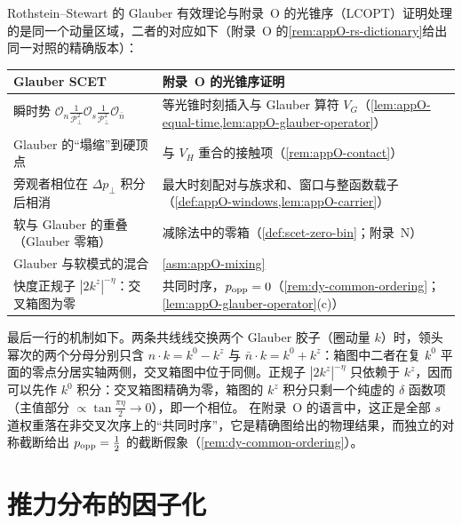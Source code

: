 \begin{remark}\label{rem:scet-glauber-dictionary}
Rothstein--Stewart 的 Glauber 有效理论与附录~O 的光锥序（LCOPT）证明处理的是同一个动量区域，二者的对应如下（附录~O 的\cref{rem:appO-rs-dictionary}给出同一对照的精确版本）：
\begin{center}\small
\renewcommand{\arraystretch}{1.15}
\begin{tabular}{@{}p{}p{}@{}}
\toprule
Glauber SCET\cite{RothsteinStewart2016} & 附录~O 的光锥序证明 \\
\midrule
瞬时势 $\mathcal O_n\frac{1}{\mathcal P_\perp^2}\mathcal O_s\frac{1}{\mathcal P_\perp^2}\mathcal O_{\bar n}$ & 等光锥时刻插入与 Glauber 算符 $V_G$（\cref{lem:appO-equal-time,lem:appO-glauber-operator}） \\
Glauber 的“塌缩”到硬顶点 & 与 $V_H$ 重合的接触项（\cref{rem:appO-contact}） \\
旁观者相位在 $\Delta p_\perp$ 积分后相消 & 最大时刻配对与族求和、窗口与整函数载子（\cref{def:appO-windows,lem:appO-carrier}） \\
软与 Glauber 的重叠（Glauber 零箱） & 减除法中的零箱（\cref{def:scet-zero-bin}；附录~N） \\
Glauber 与软模式的混合 & \cref{asm:appO-mixing} \\
快度正规子 $|2k^z|^{-\eta}$：交叉箱图为零 & 共同时序，$p_{\rm opp}=0$（\cref{rem:dy-common-ordering}；\cref{lem:appO-glauber-operator}(c)） \\
\bottomrule
\end{tabular}
\end{center}
最后一行的机制如下。两条共线线交换两个 Glauber 胶子（圈动量 $k$）时，领头幂次的两个分母分别只含 $n\cdot k=k^0-k^z$ 与 $\bar n\cdot k=k^0+k^z$：箱图中二者在复 $k^0$ 平面的零点分居实轴两侧，交叉箱图中位于同侧。正规子 $|2k^z|^{-\eta}$ 只依赖于 $k^z$，因而可以先作 $k^0$ 积分：交叉箱图精确为零，箱图的 $k^z$ 积分只剩一个纯虚的 $\delta$ 函数项（主值部分 $\propto\tan\frac{\pi\eta}{2}\to0$），即一个相位\cite[第~5.2~节]{RothsteinStewart2016}。%
在附录~O 的语言中，这正是全部 $s$ 道权重落在非交叉次序上的“共同时序”，它是精确图给出的物理结果，而独立的对称截断给出 $p_{\rm opp}=\frac12$ 的截断假象（\cref{rem:dy-common-ordering}）。
\end{remark}

\section{推力分布的因子化}\label{sec:scet-thrust}

